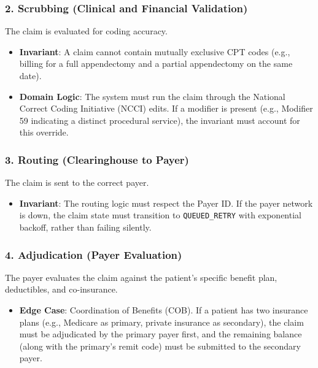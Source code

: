 \subsubsection{2. Scrubbing (Clinical and Financial
Validation)}\label{scrubbing-clinical-and-financial-validation}

The claim is evaluated for coding accuracy.

\begin{itemize}
\tightlist
\item
  \textbf{Invariant}: A claim cannot contain mutually exclusive CPT
  codes (e.g., billing for a full appendectomy and a partial
  appendectomy on the same date).
\item
  \textbf{Domain Logic}: The system must run the claim through the
  National Correct Coding Initiative (NCCI) edits. If a modifier is
  present (e.g., Modifier 59 indicating a distinct procedural service),
  the invariant must account for this override.
\end{itemize}

\subsubsection{3. Routing (Clearinghouse to
Payer)}\label{routing-clearinghouse-to-payer}

The claim is sent to the correct payer.

\begin{itemize}
\tightlist
\item
  \textbf{Invariant}: The routing logic must respect the Payer ID. If
  the payer network is down, the claim state must transition to
  \texttt{QUEUED\_RETRY} with exponential backoff, rather than failing
  silently.
\end{itemize}

\subsubsection{4. Adjudication (Payer
Evaluation)}\label{adjudication-payer-evaluation}

The payer evaluates the claim against the patient's specific benefit
plan, deductibles, and co-insurance.

\begin{itemize}
\tightlist
\item
  \textbf{Edge Case}: Coordination of Benefits (COB). If a patient has
  two insurance plans (e.g., Medicare as primary, private insurance as
  secondary), the claim must be adjudicated by the primary payer first,
  and the remaining balance (along with the primary's remit code) must
  be submitted to the secondary payer.
\end{itemize}

